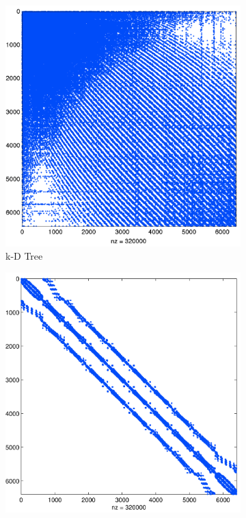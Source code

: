 \documentclass{report}
\begin{document}
\begin{figure}
\centering
\begin{subfigure}{0.425\textwidth}
\includegraphics[width=1.0\textwidth]{../figures/chapter2/hashing_example/bruteforce_N6400_n50-eps-converted-to.png}
\caption{k-D Tree} 
\end{subfigure} 
\begin{subfigure}{0.425\textwidth}
\includegraphics[width=1.0\textwidth]{../figures/chapter2/hashing_example/lsh_N6400_n50-eps-converted-to.png}

\end{subfigure}
\end{figure}
\end{document}
